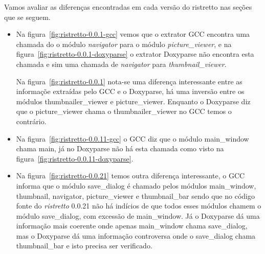 Vamos avaliar as diferenças encontradas em cada versão do ristretto nas seções que se seguem.


\begin{itemize}

\item Na figura~\ref{fig:ristretto-0.0.1-gcc} vemos que o extrator GCC encontra uma chamada do o módulo {\it navigator} para o módulo {\it picture\_viewer}, e na figura~\ref{fig:ristretto-0.0.1-doxyparse} o extrator Doxyparse não encontra esta chamada e sim uma chamada de {\it navigator} para {\it thumbnail\_viewer}.

Na figura~\ref{fig:ristretto-0.0.1} nota-se uma diferença interessante entre as
informaçõe extraídas pelo GCC e o Doxyparse, há uma inversão entre os módulos
thumbnailer\_viewer e picture\_viewer. Enquanto o Doxyparse diz que o
picture\_viewer chama o thumbnailer\_viewer no GCC temos o contrário.


\item Na figura~\ref{fig:ristretto-0.0.11-gcc} o GCC diz que o módulo main\_window chama
main, já no Doxyparse não há esta chamada como visto na figura~\ref{fig:ristretto-0.0.11-doxyparse}. 


\item Na figura~\ref{fig:ristretto-0.0.21} temos outra diferença interessante, o GCC
informa que o módulo save\_dialog é chamado pelos módulos main\_window,
thumbnail, navigator, picture\_viewer e thumbnail\_bar sendo que no código
fonte do {\it ristretto} 0.0.21 não há indícios de que todos esses módulos chamem o
módulo save\_dialog, com excessão de main\_window. Já o Doxyparse dá uma
informação mais coerente onde apenas main\_window chama save\_dialog, mas o
Doxyparse dá uma informação controversa onde o save\_dialog chama
thumbnail\_bar e isto precisa ser verificado.

\end{itemize}

